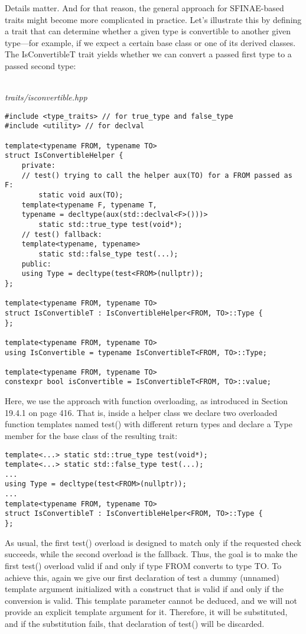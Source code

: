 Details matter. And for that reason, the general approach for SFINAE-based traits might become more complicated in practice. Let’s illustrate this by defining a trait that can determine whether a given type is convertible to another given type—for example, if we expect a certain base class or one of its derived classes. The IsConvertibleT trait yields whether we can convert a passed first type to a passed second type:

\hspace*{\fill} \\ %
\noindent
\textit{traits/isconvertible.hpp}
\begin{lstlisting}[style=styleCXX]
#include <type_traits> // for true_type and false_type
#include <utility> // for declval

template<typename FROM, typename TO>
struct IsConvertibleHelper {
	private:
	// test() trying to call the helper aux(TO) for a FROM passed as F:
		static void aux(TO);
	template<typename F, typename T,
	typename = decltype(aux(std::declval<F>()))>
		static std::true_type test(void*);
	// test() fallback:
	template<typename, typename>
		static std::false_type test(...);
	public:
	using Type = decltype(test<FROM>(nullptr));
};

template<typename FROM, typename TO>
struct IsConvertibleT : IsConvertibleHelper<FROM, TO>::Type {
};

template<typename FROM, typename TO>
using IsConvertible = typename IsConvertibleT<FROM, TO>::Type;

template<typename FROM, typename TO>
constexpr bool isConvertible = IsConvertibleT<FROM, TO>::value;
\end{lstlisting}

Here, we use the approach with function overloading, as introduced in Section 19.4.1 on page 416. That is, inside a helper class we declare two overloaded function templates named test() with different return types and declare a Type member for the base class of the resulting trait:

\begin{lstlisting}[style=styleCXX]
template<...> static std::true_type test(void*);
template<...> static std::false_type test(...);
...
using Type = decltype(test<FROM>(nullptr));
...
template<typename FROM, typename TO>
struct IsConvertibleT : IsConvertibleHelper<FROM, TO>::Type {
};
\end{lstlisting}

As usual, the first test() overload is designed to match only if the requested check succeeds, while the second overload is the fallback. Thus, the goal is to make the first test() overload valid if and only if type FROM converts to type TO. To achieve this, again we give our first declaration of test a dummy (unnamed) template argument initialized with a construct that is valid if and only if the conversion is valid. This template parameter cannot be deduced, and we will not provide an explicit template argument for it. Therefore, it will be substituted, and if the substitution fails, that declaration of test() will be discarded.

